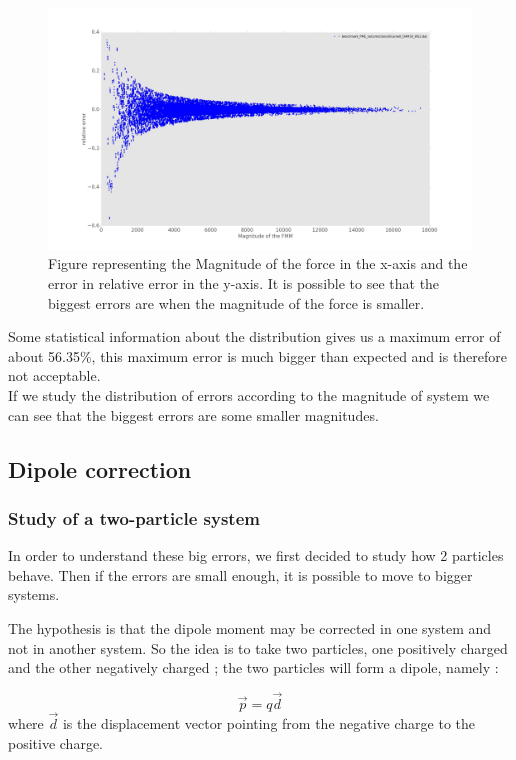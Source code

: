 \documentclass[11pt,twoside,a4paper]{report}
\begin{document}
	\begin{figure}[H]
	   \includegraphics[scale=0.2]{magErr_noCorrection.jpeg}
    \centering 
    \caption{Figure representing the Magnitude of the force in the x-axis and the  error in relative error in the y-axis. It is possible to see that the biggest errors are when the magnitude of the force is smaller.}    
   \end{figure}  


	Some statistical information about the distribution gives us a maximum error of about 56.35\%, this maximum error is much bigger than expected and is therefore not acceptable.\\
	
	If we study the distribution of errors according to the magnitude of system we can see that the biggest errors are some smaller magnitudes.
	

	
\subsection{Dipole correction}
\subsubsection{Study of a two-particle system}
	In order to understand these big errors, we first decided to study how 2 particles behave. Then if the errors are small enough, it is possible to move to bigger systems.
	
The hypothesis is that the dipole moment may be corrected in one system and not in another system. So the idea is to take two particles, one positively charged and the other negatively charged ; the two particles will form a dipole, namely : 

\begin{equation}
	\vec{p} = q \vec{d}
\end{equation}	
	where $\vec{d}$ is the displacement vector pointing from the negative charge to the positive charge. 
	
\end{document}
